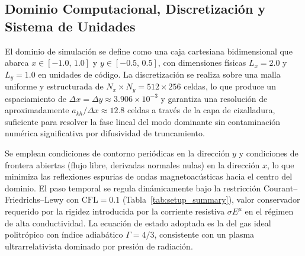 







\subsection{Dominio Computacional, Discretización y Sistema de Unidades}
\label{subsec:dominio_unidades}

El dominio de simulación se define como una caja cartesiana bidimensional que abarca $x \in [-1.0,\,1.0]$ y $y \in [-0.5,\,0.5]$, con dimensiones físicas $L_x = 2.0$ y $L_y = 1.0$ en unidades de código. La discretización se realiza sobre una malla uniforme y estructurada de $N_x \times N_y = 512 \times 256$ celdas, lo que produce un espaciamiento de $\Delta x = \Delta y \approx 3.906 \times 10^{-3}$ y garantiza una resolución de aproximadamente $a_{kh}/\Delta x \approx 12.8$ celdas a través de la capa de cizalladura, suficiente para resolver la fase lineal del modo dominante sin contaminación numérica significativa por difusividad de truncamiento.

Se emplean condiciones de contorno periódicas en la dirección $y$  y condiciones de frontera abiertas (flujo libre, derivadas normales nulas) en la dirección $x$, lo que minimiza las reflexiones espurias de ondas magnetoacústicas hacia el centro del dominio. El paso temporal se regula dinámicamente bajo la restricción Courant--Friedrichs--Lewy con $\mathrm{CFL}=0.1$ (Tabla~\ref{tab:setup_summary}), valor conservador requerido por la rigidez introducida por la corriente resistiva $\sigma E^\mu$ en el régimen de alta conductividad. La ecuación de estado adoptada es la del gas ideal politrópico con índice adiabático $\Gamma = 4/3$, consistente con un plasma ultrarrelativista dominado por presión de radiación.

